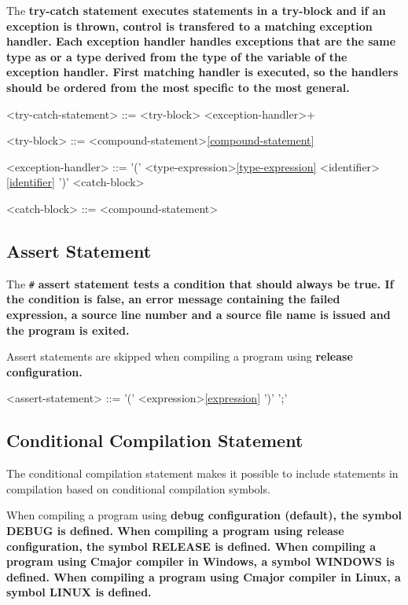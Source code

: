 \documentclass[a4paper,oneside,11pt]{article}
\begin{document}
The \bf{try-catch} statement executes statements in a try-block and if an exception is thrown, control is transfered
to a matching exception handler. Each exception handler handles exceptions that are the same type as or a type derived from
the type of the variable of the exception handler. First matching handler is executed, so the handlers should be
ordered from the most specific to the most general.

\begin{grammar}
\label{try-catch-statement}<try-catch-statement> ::=  <try-block> <exception-handler>+

<try-block> ::= <compound-statement>\ref{compound-statement}

<exception-handler> ::=  '(' <type-expression>\ref{type-expression} <identifier>\ref{identifier} ')' <catch-block>

<catch-block> ::= <compound-statement>
\end{grammar}

\subsection{Assert Statement}

The \verb|#| \bf{assert} statement tests a condition that should always be true.
If the condition is false, an error message containing the failed expression, a source line number and a source file name is issued and the program is exited.

Assert statements are skipped when compiling a program using \bf{release} configuration.

\begin{grammar}
\label{assert-statement}<assert-statement> ::=  '(' <expression>\ref{expression} ')' ';'
\end{grammar}

\subsection{Conditional Compilation Statement}

The conditional compilation statement makes it possible to include statements in compilation
based on conditional compilation symbols.

When compiling a program using \bf{debug} configuration (default), the symbol DEBUG is defined.
When compiling a program using \bf{release} configuration, the symbol RELEASE is defined.
When compiling a program using Cmajor compiler in Windows, a symbol WINDOWS is defined.
When compiling a program using Cmajor compiler in Linux, a symbol LINUX is defined.
\end{document}
